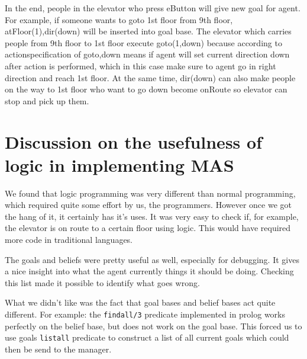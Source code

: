 \documentclass[a4paper,10pt,twocolumn]{article}
\begin{document}
In the end, people in the elevator who press eButton will give new goal for agent. For example, if someone wants to goto 1st floor from 9th floor, atFloor(1),dir(down) will be inserted into goal base. The elevator which carries people from 9th floor to 1st floor execute goto(1,down) because according to actionspecification of goto,down means if agent will set current direction down after action is performed, which in this case make sure to agent go in right direction and reach 1st floor. At the same time, dir(down) can also make people on the way to 1st floor who want to go down become onRoute so elevator can stop and pick up them.

\section{Discussion on the usefulness of logic in implementing MAS}
We found that logic programming was very different than normal programming, which required quite some effort by us, the programmers. However once we got the hang of it, it certainly has it's uses. It was very easy to check if, for example, the elevator is on route to a certain floor using logic. This would have required more code in traditional languages. 

The goals and beliefs were pretty useful as well, especially for debugging. It gives a nice insight into what the agent currently things it should be doing. Checking this list made it possible to identify what goes wrong. 

What we didn't like was the fact that goal bases and belief bases act quite different. For example: the \texttt{findall/3} predicate implemented in prolog works perfectly on the belief base, but does not work on the goal base. This forced us to use goals \texttt{listall} predicate to construct a list of all current goals which could then be send to the manager. 
\end{document}
